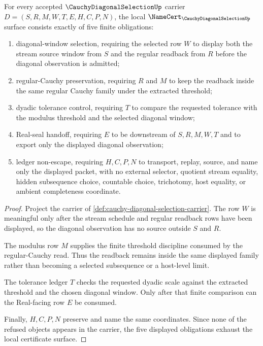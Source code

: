 \begin{theorem}
\label{thm:cauchy-diagonal-selection-namecert-obligations}
For every accepted $\CauchyDiagonalSelectionUp$ carrier $D=(S,R,M,W,T,E,H,C,P,N)$, the local $\NameCert_{\CauchyDiagonalSelectionUp}$ surface consists exactly of five finite obligations:
\begin{enumerate}
\item diagonal-window selection, requiring the selected row $W$ to display both the stream source window from $S$ and the regular readback from $R$ before the diagonal observation is admitted;
\item regular-Cauchy preservation, requiring $R$ and $M$ to keep the readback inside the same regular Cauchy family under the extracted threshold;
\item dyadic tolerance control, requiring $T$ to compare the requested tolerance with the modulus threshold and the selected diagonal window;
\item Real-seal handoff, requiring $E$ to be downstream of $S,R,M,W,T$ and to export only the displayed diagonal observation;
\item ledger non-escape, requiring $H,C,P,N$ to transport, replay, source, and name only the displayed packet, with no external selector, quotient stream equality, hidden subsequence choice, countable choice, trichotomy, host equality, or ambient completeness coordinate.
\end{enumerate}
\end{theorem}
\begin{proof}
Project the carrier of \autoref{def:cauchy-diagonal-selection-carrier}. The row $W$ is meaningful only after the stream schedule and regular readback rows have been displayed, so the diagonal observation has no source outside $S$ and $R$.

The modulus row $M$ supplies the finite threshold discipline consumed by the regular-Cauchy read. Thus the readback remains inside the same displayed family rather than becoming a selected subsequence or a host-level limit.

The tolerance ledger $T$ checks the requested dyadic scale against the extracted threshold and the chosen diagonal window. Only after that finite comparison can the Real-facing row $E$ be consumed.

Finally, $H,C,P,N$ preserve and name the same coordinates. Since none of the refused objects appears in the carrier, the five displayed obligations exhaust the local certificate surface.
\end{proof}


